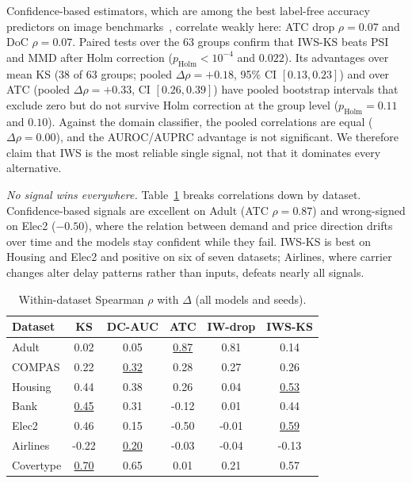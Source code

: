 \documentclass[conference]{IEEEtran}
\theoremstyle{plainhead}
\newcommand{\iws}{\textsc{IWS}}
\begin{document}
Confidence-based estimators, which are among the best label-free accuracy predictors on image benchmarks~\cite{garg2022atc,guillory2021doc}, correlate weakly here: ATC drop $\rho=0.07$ and DoC $\rho=0.07$. Paired tests over the 63 groups confirm that \iws{}-KS beats PSI and MMD after Holm correction ($p_\text{Holm}<10^{-4}$ and $0.022$). Its advantages over mean KS (38 of 63 groups; pooled $\Delta\rho=+0.18$, 95\% CI $[0.13,0.23]$) and over ATC (pooled $\Delta\rho=+0.33$, CI $[0.26,0.39]$) have pooled bootstrap intervals that exclude zero but do not survive Holm correction at the group level ($p_\text{Holm}=0.11$ and $0.10$). Against the domain classifier, the pooled correlations are equal ($\Delta\rho=0.00$), and the AUROC/AUPRC advantage is not significant. We therefore claim that \iws{} is the most reliable single signal, not that it dominates every alternative.

\textit{No signal wins everywhere.} Table~\ref{tab:perds} breaks correlations down by dataset. Confidence-based signals are excellent on Adult (ATC $\rho=0.87$) and wrong-signed on Elec2 ($-0.50$), where the relation between demand and price direction drifts over time and the models stay confident while they fail. \iws{}-KS is best on Housing and Elec2 and positive on six of seven datasets; Airlines, where carrier changes alter delay patterns rather than inputs, defeats nearly all signals.

\begin{table}[t]
\centering
\caption{Within-dataset Spearman $\rho$ with $\Delta$ (all models and seeds).}
\label{tab:perds}
\footnotesize
\begin{tabular}{lccccc}
\toprule
Dataset & KS & DC-AUC & ATC & IW-drop & IWS-KS \\
\midrule
Adult & 0.02 & 0.05 & \underline{0.87} & 0.81 & 0.14 \\
COMPAS & 0.22 & \underline{0.32} & 0.28 & 0.27 & 0.26 \\
Housing & 0.44 & 0.38 & 0.26 & 0.04 & \underline{0.53} \\
Bank & \underline{0.45} & 0.31 & -0.12 & 0.01 & 0.44 \\
Elec2 & 0.46 & 0.15 & -0.50 & -0.01 & \underline{0.59} \\
Airlines & -0.22 & \underline{0.20} & -0.03 & -0.04 & -0.13 \\
Covertype & \underline{0.70} & 0.65 & 0.01 & 0.21 & 0.57 \\
\bottomrule
\end{tabular}
\end{table}
\end{document}
